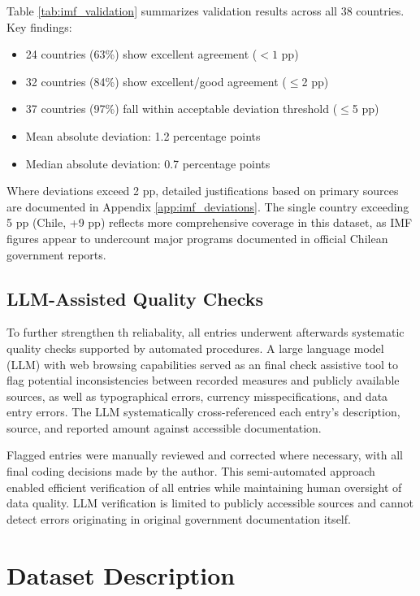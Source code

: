 \documentclass[12pt]{article}
\begin{document}
Table \ref{tab:imf_validation} summarizes validation results across all 38 countries. Key findings:

\begin{itemize}
\item 24 countries (63\%) show excellent agreement ($<1$ pp)
\item 32 countries (84\%) show excellent/good agreement ($\leq$2 pp)
\item 37 countries (97\%) fall within acceptable deviation threshold ($\leq$5 pp)
\item Mean absolute deviation: 1.2 percentage points
\item Median absolute deviation: 0.7 percentage points
\end{itemize}

Where deviations exceed 2 pp, detailed justifications based on primary sources are documented in Appendix \ref{app:imf_deviations}. The single country exceeding 5 pp (Chile, +9 pp) reflects more comprehensive coverage in this dataset, as IMF figures appear to undercount major programs documented in official Chilean government reports.

\subsection{LLM-Assisted Quality Checks}

To further strengthen th reliabality, all entries underwent afterwards systematic quality checks supported by automated procedures. A large language model (LLM) with web browsing capabilities served as an final check assistive tool to flag potential inconsistencies between recorded measures and publicly available sources, as well as typographical errors, currency misspecifications, and data entry errors. The LLM systematically cross-referenced each entry's description, source, and reported amount against accessible documentation.

Flagged entries were manually reviewed and corrected where necessary, with all final coding decisions made by the author. This semi-automated approach enabled efficient verification of all entries while maintaining human oversight of data quality. LLM verification is limited to publicly accessible sources and cannot detect errors originating in original government documentation itself.

\section{Dataset Description}
\end{document}
